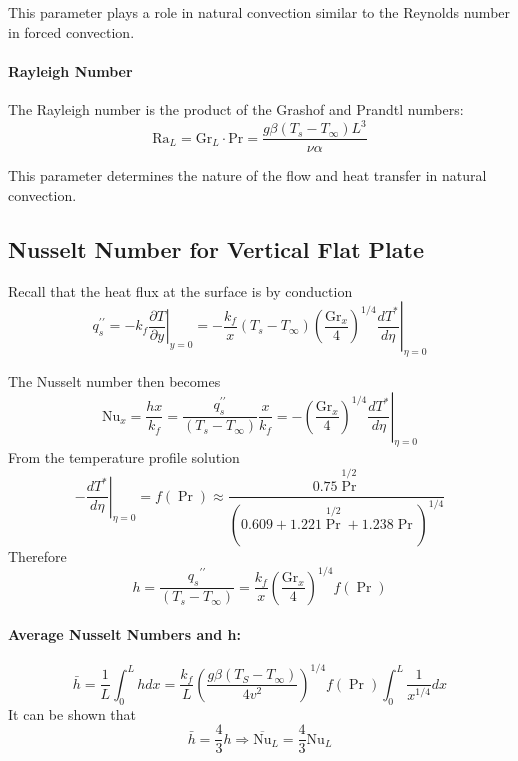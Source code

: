 This parameter plays a role in natural convection similar to the Reynolds number in forced convection.
%
\begin{definition}
\paragraph{Rayleigh Number}

The Rayleigh number is the product of the Grashof and Prandtl numbers:
\[
    \text{Ra}_L = \text{Gr}_L \cdot \text{Pr} = \frac{g\beta(T_s-T_\infty)L^3}{\nu\alpha}
\]
\end{definition}
This parameter determines the nature of the flow and heat transfer in natural convection.

\subsection*{Nusselt Number for Vertical Flat Plate}
Recall that the heat flux at the surface is by conduction
\[
    q_s^{\prime \prime}=-\left.k_f \frac{\partial T}{\partial y}\right|_{y=0}=-\left.\frac{k_f}{x}\left(T_s-T_{\infty}\right)\left(\frac{\mathrm{Gr}_x}{4}\right)^{1 / 4} \frac{d T^*}{d \eta}\right|_{\eta=0}
\]
\begin{definition}
 The Nusselt number then becomes
\[
    \mathrm{Nu}_x=\frac{h x}{k_f}=\frac{q_s^{\prime \prime}}{\left(T_s-T_{\infty}\right)} \frac{x}{k_f}=-\left.\left(\frac{\mathrm{Gr}_x}{4}\right)^{1 / 4} \frac{d T^*}{d \eta}\right|_{\eta=0}
\]
From the temperature profile solution
\[
    -\left.\frac{d T^*}{d \eta}\right|_{\eta=0}=f(\operatorname{Pr}) \approx \frac{0.75 \operatorname{Pr}^{1 / 2}}{\left(0.609+1.221 \operatorname{Pr}^{1 / 2}+1.238 \operatorname{Pr}\right)^{1 / 4}}
\]   
%
Therefore
\[
    h=\frac{q_s{ }^{\prime \prime}}{\left(T_s-T_{\infty}\right)}=\frac{k_f}{x}\left(\frac{\mathrm{Gr}_x}{4}\right)^{1 / 4} f(\operatorname{Pr})
\]
\end{definition}
%
\paragraph{Average Nusselt Numbers and h:} 
\[
    \bar{h}=\frac{1}{L} \int_0^L h d x=\frac{k_f}{L}\left(\frac{g \beta\left(T_S-T_{\infty}\right)}{4 v^2}\right)^{1 / 4} f(\operatorname{Pr}) \int_0^L \frac{1}{x^{1 / 4}} d x
\]
It can be shown that
\[
    \bar{h}=\frac{4}{3} h \Rightarrow \overline{\mathrm{Nu}}_L=\frac{4}{3} \mathrm{Nu}_L
\]
